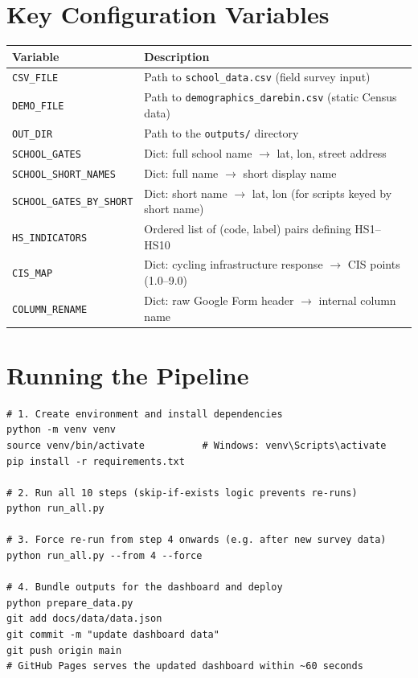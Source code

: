 \documentclass[11pt,a4paper,openany]{book}
\begin{document}
\section*{Key Configuration Variables}

\begin{center}
\begin{tabular}{lL{8.5cm}}
\toprule
Variable & Description \\
\midrule
\texttt{CSV\_FILE}     & Path to \texttt{school\_data.csv} (field survey input) \\
\texttt{DEMO\_FILE}    & Path to \texttt{demographics\_darebin.csv} (static Census data) \\
\texttt{OUT\_DIR}      & Path to the \texttt{outputs/} directory \\
\texttt{SCHOOL\_GATES} & Dict: full school name $\to$ lat, lon, street address \\
\texttt{SCHOOL\_SHORT\_NAMES} & Dict: full name $\to$ short display name \\
\texttt{SCHOOL\_GATES\_BY\_SHORT} & Dict: short name $\to$ lat, lon (for scripts keyed by short name) \\
\texttt{HS\_INDICATORS} & Ordered list of (code, label) pairs defining HS1--HS10 \\
\texttt{CIS\_MAP}      & Dict: cycling infrastructure response $\to$ CIS points (1.0--9.0) \\
\texttt{COLUMN\_RENAME} & Dict: raw Google Form header $\to$ internal column name \\
\bottomrule
\end{tabular}
\end{center}

\section*{Running the Pipeline}

\begin{lstlisting}[style=bash, caption={Full pipeline run from a clean checkout.}]
# 1. Create environment and install dependencies
python -m venv venv
source venv/bin/activate          # Windows: venv\Scripts\activate
pip install -r requirements.txt

# 2. Run all 10 steps (skip-if-exists logic prevents re-runs)
python run_all.py

# 3. Force re-run from step 4 onwards (e.g. after new survey data)
python run_all.py --from 4 --force

# 4. Bundle outputs for the dashboard and deploy
python prepare_data.py
git add docs/data/data.json
git commit -m "update dashboard data"
git push origin main
# GitHub Pages serves the updated dashboard within ~60 seconds
\end{lstlisting}
\end{document}
